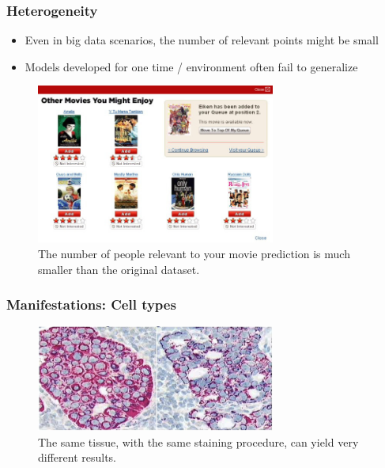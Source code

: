 \documentclass[10pt,mathserif]{beamer}
\begin{document}
\begin{frame}
  \frametitle{Heterogeneity}
  \begin{itemize}
  \item Even in big data scenarios, the number of relevant points might be small
  \item Models developed for one time / environment often fail to generalize
  \end{itemize}
 \begin{figure}[ht]
   \centering
   \includegraphics[width=0.7\textwidth]{figures/netflix_abstraction}
   \caption{The number of people relevant to your movie prediction is much
     smaller than the original dataset. \label{fig:label} }
 \end{figure}
 
\end{frame}

\begin{frame}
  \frametitle{Manifestations: Cell types}
  \begin{figure}[ht]
    \centering
    \includegraphics[width=0.7\textwidth]{figures/heterogeneity}
    \caption{The same tissue, with the same staining procedure, can yield very
      different results. \label{fig:label} }
  \end{figure}
\end{frame}
\end{document}

